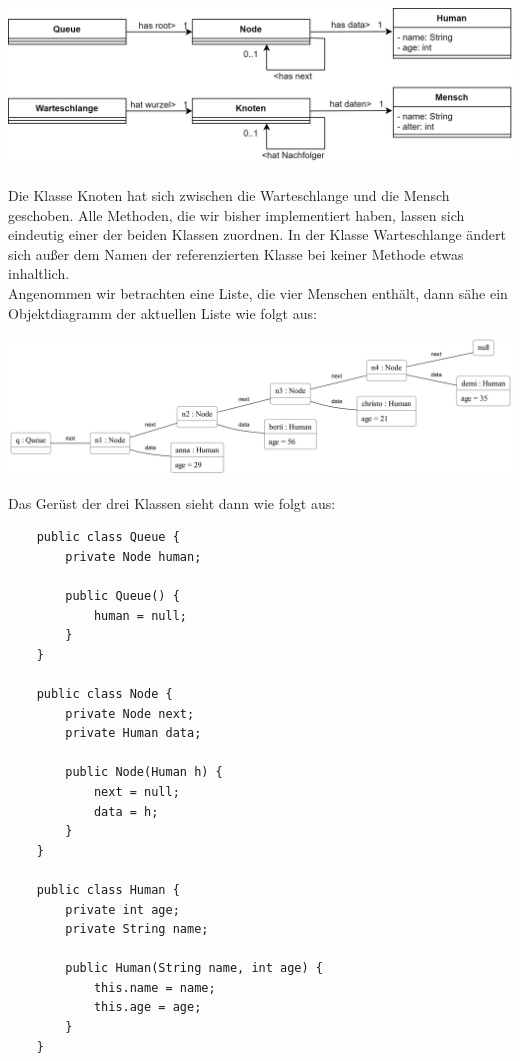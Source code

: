 \documentclass{article}
\begin{document}
\begin{center}
    \includegraphics[scale = 0.2]{../../media/linked_list_nodes_diagram.png}
\end{center}
Die Klasse Knoten hat sich zwischen die Warteschlange und die  Mensch geschoben. Alle Methoden, die wir bisher implementiert haben, lassen sich eindeutig einer der beiden Klassen zuordnen. In der Klasse Warteschlange ändert sich außer dem Namen der referenzierten Klasse bei keiner Methode etwas inhaltlich. \\
Angenommen wir betrachten eine Liste, die vier Menschen enthält, dann sähe ein Objektdiagramm der aktuellen Liste wie folgt aus: \\
\begin{center}
    \includegraphics[scale = 0.14]{../../media/linked_list_nodes_objectdiagram.png}
\end{center}
Das Gerüst der drei Klassen sieht dann wie folgt aus: 
\begin{verbatim}
    public class Queue {
        private Node human;

        public Queue() {
            human = null;
        }
    }

    public class Node {
        private Node next;
        private Human data;

        public Node(Human h) {
            next = null;
            data = h;
        }
    }

    public class Human {
        private int age;
        private String name;

        public Human(String name, int age) {
            this.name = name;
            this.age = age;
        }
    }
\end{verbatim}
\end{document}

